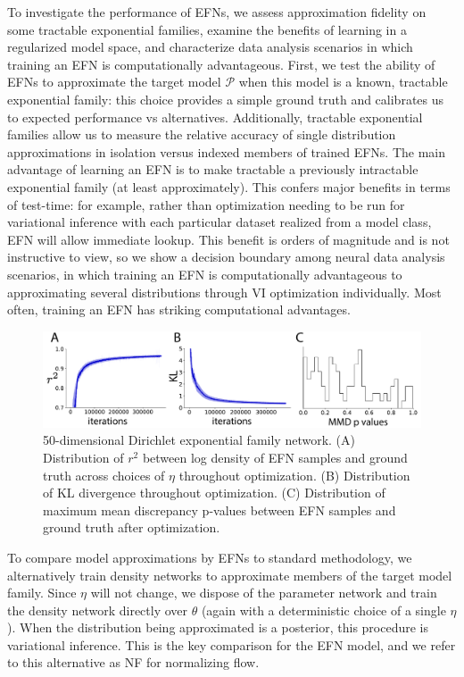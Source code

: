 \documentclass{article}
\begin{document}
To investigate the performance of EFNs, we assess approximation fidelity on some tractable exponential families, examine the benefits of learning in a regularized model space, and characterize data analysis scenarios in which training an EFN is computationally advantageous.  First, we test the ability of EFNs to approximate the target model $\mathcal{P}$ when this model is a known, tractable exponential family: this choice provides a simple ground truth and calibrates us to expected performance vs alternatives.   Additionally, tractable exponential families allow us to measure the relative accuracy of single distribution approximations in isolation versus indexed members of trained EFNs.  The main advantage of learning an EFN is to make tractable a previously intractable exponential family (at least approximately).  This confers major benefits in terms of test-time: for example, rather than optimization needing to be run for variational inference with each particular dataset realized from a model class, EFN will allow immediate lookup.  This benefit is orders of magnitude and is not instructive to view, so we show a decision boundary among neural data analysis scenarios, in which training an EFN is computationally advantageous to approximating several distributions through VI optimization individually.  Most often, training an EFN has striking computational advantages. 

\begin{figure}[b]
  \centering
\includegraphics[width=1.0\linewidth]{figs/fig2/fig2.pdf}
  \caption{50-dimensional Dirichlet exponential family network.  (A) Distribution of $r^2$ between log density of EFN samples and ground truth across choices of $\eta$ throughout optimization.  (B) Distribution of KL divergence throughout optimization.  (C) Distribution of maximum mean discrepancy p-values between EFN samples and ground truth after optimization.}
\end{figure}

To compare model approximations by EFNs to standard methodology, we alternatively train density networks to approximate members of the target model family.  Since $\eta$ will not change, we dispose of the parameter network and train the density network directly over $\theta$ (again with a deterministic choice of a single $\eta$).  When the distribution being approximated is a posterior, this procedure is variational inference.  This is the key comparison for the EFN model, and we refer to this alternative as NF for normalizing flow.
\end{document}
